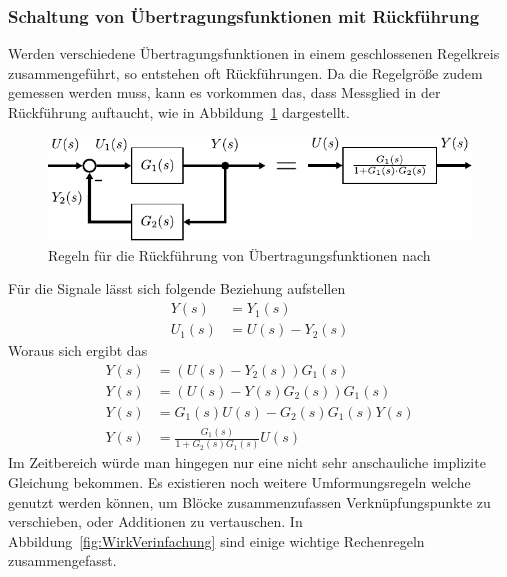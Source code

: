 \subsubsection{Schaltung von Übertragungsfunktionen mit Rückführung}
%
Werden verschiedene Übertragungsfunktionen in einem geschlossenen Regelkreis zusammengeführt, so entstehen oft Rückführungen. Da die Regelgröße zudem gemessen werden muss, kann es vorkommen das, dass Messglied in der Rückführung auftaucht, wie in Abbildung~\ref{fig:Rückführung} dargestellt.
%
\begin{figure}[ht!]
	\centering
	\includegraphics[width=0.85\linewidth]{Abbildungen/Modellbildung/PDF/RechenregelnRueckkopplung.pdf}
	\caption{Regeln für die Rückführung von Übertragungsfunktionen nach \cite{Lunze10}}
	\label{fig:Rückführung}
\end{figure}
%
Für die Signale lässt sich folgende Beziehung aufstellen
%
\begin{equation*}
\begin{aligned}
%
Y(s)&=Y_{1}(s)\\
U_{1}(s)&=U(s)-Y_{2}(s)
%
\end{aligned}
\end{equation*} 
%
Woraus sich ergibt das
%
\begin{equation*}
\begin{aligned}
%
Y(s)&=\left(U(s)-Y_{2}(s)\right)G_{1}(s)\\
Y(s)&=\left(U(s)-Y(s)G_{2}(s)\right)G_{1}(s)\\
Y(s)&=G_{1}(s)U(s)-G_{2}(s)G_{1}(s)Y(s)\\
Y(s)&=\frac{G_{1}(s)}{1+G_{2}(s)G_{1}(s)}U(s)
%
\end{aligned}
\end{equation*}
%
Im Zeitbereich würde man hingegen nur eine nicht sehr anschauliche implizite Gleichung bekommen. Es existieren noch weitere Umformungsregeln welche genutzt werden können, um Blöcke zusammenzufassen Verknüpfungspunkte zu verschieben, oder Additionen zu vertauschen. In Abbildung~\ref{fig:WirkVerinfachung} sind einige wichtige Rechenregeln zusammengefasst.
%
